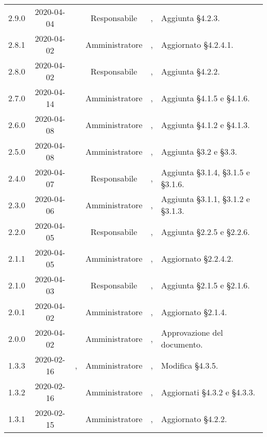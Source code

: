 {\begin{longtable}{ c c  C{2.3cm} c C{3cm} C{3.2cm}}
2.9.0 & 2020-04-04 & \LD{} & Responsabile &  \AT{}, \PF{} & Aggiunta §4.2.3.  \\

2.8.1 & 2020-04-02 & \SE{} & Amministratore &  \AT{}, \PF{} & Aggiornato §4.2.4.1.  \\

2.8.0 & 2020-04-02 & \LD{} & Responsabile &  \AT{}, \PF{} & Aggiunta §4.2.2.  \\

2.7.0 & 2020-04-14 & \SE{} & Amministratore &  \AT{}, \PF{} & Aggiunta §4.1.5 e §4.1.6.  \\

2.6.0 & 2020-04-08 & \BR{} & Amministratore &  \AT{}, \PF{} & Aggiunta §4.1.2 e §4.1.3.  \\

2.5.0 & 2020-04-08 & \SE{} & Amministratore &  \AT{}, \PF{} & Aggiunta §3.2 e §3.3.  \\

2.4.0 & 2020-04-07 & \LD{} & Responsabile &  \AT{}, \PF{} & Aggiunta §3.1.4, §3.1.5 e §3.1.6.  \\

2.3.0 & 2020-04-06 & \SE{} & Amministratore &  \AT{}, \PF{} & Aggiunta §3.1.1, §3.1.2 e §3.1.3.  \\

2.2.0 & 2020-04-05 & \LD{} & Responsabile &  \AT{}, \PF{} & Aggiunta §2.2.5 e §2.2.6.  \\

2.1.1 & 2020-04-05 & \BR{} & Amministratore &  \AT{}, \PF{} & Aggiornato §2.2.4.2.  \\

2.1.0 & 2020-04-03 & \LD{} & Responsabile &  \AT{}, \PF{} & Aggiunta §2.1.5 e §2.1.6.  \\

2.0.1 & 2020-04-02 & \SE{} & Amministratore &  \AT{}, \PF{} & Aggiornato §2.1.4.  \\

2.0.0 & 2020-04-02 & \LD{} & Amministratore & \CE{}, \MC{} & Approvazione del documento. \\

1.3.3 & 2020-02-16 & \DF{}, \PF{} & Amministratore & \CE{}, \MC{} & Modifica §4.3.5. \\

1.3.2 & 2020-02-16 & \SE{} & Amministratore & \CE{}, \MC{} & Aggiornati §4.3.2 e §4.3.3. \\

1.3.1 & 2020-02-15 & \SE{} & Amministratore & \CE{}, \MC{} & Aggiornato §4.2.2. \\


\end{longtable}}
